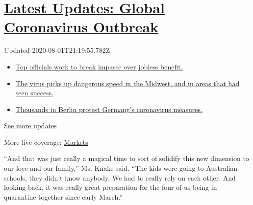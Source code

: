 \hypertarget{latest-updates-global-coronavirus-outbreak}{%
\section{\texorpdfstring{\href{https://www.nytimes3xbfgragh.onion/2020/08/01/world/coronavirus-covid-19.html?action=click\&pgtype=Article\&state=default\&region=MAIN_CONTENT_1\&context=storylines_live_updates}{Latest
Updates: Global Coronavirus
Outbreak}}{Latest Updates: Global Coronavirus Outbreak}}\label{latest-updates-global-coronavirus-outbreak}}

Updated 2020-08-01T21:19:55.782Z

\begin{itemize}
\tightlist
\item
  \href{https://www.nytimes3xbfgragh.onion/2020/08/01/world/coronavirus-covid-19.html?action=click\&pgtype=Article\&state=default\&region=MAIN_CONTENT_1\&context=storylines_live_updates\#link-3ac56579}{Top
  officials work to break impasse over jobless benefit.}
\item
  \href{https://www.nytimes3xbfgragh.onion/2020/08/01/world/coronavirus-covid-19.html?action=click\&pgtype=Article\&state=default\&region=MAIN_CONTENT_1\&context=storylines_live_updates\#link-8796723}{The
  virus picks up dangerous speed in the Midwest, and in areas that had
  seen success.}
\item
  \href{https://www.nytimes3xbfgragh.onion/2020/08/01/world/coronavirus-covid-19.html?action=click\&pgtype=Article\&state=default\&region=MAIN_CONTENT_1\&context=storylines_live_updates\#link-25930521}{Thousands
  in Berlin protest Germany's coronavirus measures.}
\end{itemize}

\href{https://www.nytimes3xbfgragh.onion/2020/08/01/world/coronavirus-covid-19.html?action=click\&pgtype=Article\&state=default\&region=MAIN_CONTENT_1\&context=storylines_live_updates}{See
more updates}

More live coverage:
\href{https://www.nytimes3xbfgragh.onion/live/2020/07/31/business/stock-market-today-coronavirus?action=click\&pgtype=Article\&state=default\&region=MAIN_CONTENT_1\&context=storylines_live_updates}{Markets}

``And that was just really a magical time to sort of solidify this new
dimension to our love and our family,'' Ms. Knake said. ``The kids were
going to Australian schools, they didn't know anybody. We had to really
rely on each other. And looking back, it was really great preparation
for the four of us being in quarantine together since early March.''

